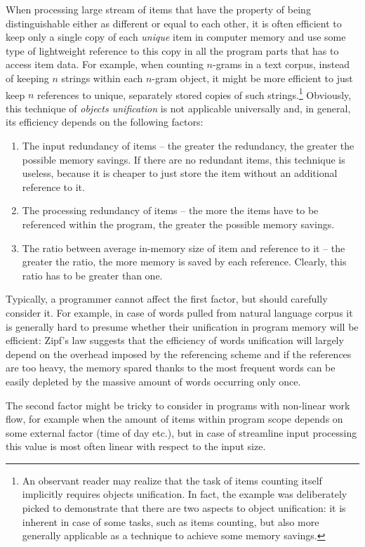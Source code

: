 When processing large stream of items that have the property of being distinguishable
either as different or equal to each other, it is often efficient to keep only a single
copy of each \emph{unique} item in computer memory and use some type of lightweight
reference to this copy in all the program parts that has to access item data.
For example, when counting $n$-grams in a text corpus, instead of keeping $n$ strings
within each $n$-gram object, it might be more efficient to just keep $n$ references to
unique, separately stored copies of such strings.\footnote{An observant reader may realize
that the task of items counting itself implicitly requires objects unification. In fact,
the example was deliberately picked to demonstrate that there are two aspects to object
unification: it is inherent in case of some tasks, such as items counting, but also more
generally applicable as a technique to achieve some memory savings.}
Obviously, this technique of \emph{objects unification} is not applicable universally and,
in general, its efficiency depends on the following factors:
\begin{enumerate}
  \item The input redundancy of items -- the greater the redundancy, the greater
  the possible memory savings. If there are no redundant items, this technique is useless,
  because it is cheaper to just store the item without an additional reference to it.
  \item The processing redundancy of items -- the more the items have to be
  referenced within the program, the greater the possible memory savings.
  \item The ratio between average in-memory size of item and reference to it -- the greater
  the ratio, the more memory is saved by each reference.
  Clearly, this ratio has to be greater than one.
\end{enumerate}

Typically, a programmer cannot affect the first factor, but should carefully consider it.
For example, in case of words pulled from natural language corpus it is generally hard to
presume whether their unification in program memory will be efficient:
Zipf's law \citep[Chapter 1]{manning:stat-nlp} suggests that the efficiency of words unification
will largely depend on the overhead imposed by the referencing scheme and if the references are
too heavy, the memory spared thanks to the most frequent words can be easily depleted by
the massive amount of words occurring only once.

The second factor might be tricky to consider in programs with non-linear work flow,
for example when the amount of items within program scope depends on some external
factor (time of day etc.), but in case of streamline input processing this value is
most often linear with respect to the input size.

